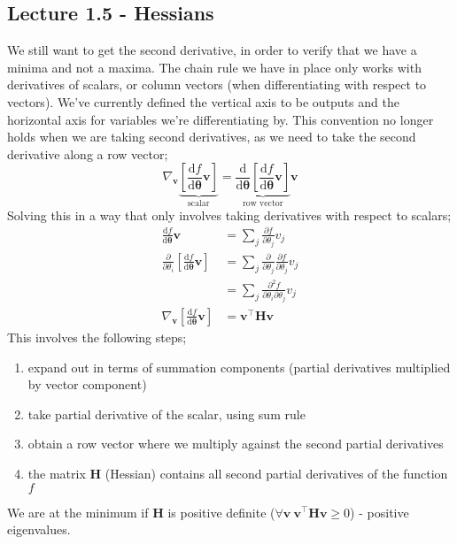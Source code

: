 \documentclass[a4paper, 12pt]{article}
\newcommand{\pdif}[2]{\frac{\partial #1}{\partial #2}}
\newcommand{\dif}[2]{\frac{\mathrm{d}#1}{\mathrm{d}#2}}
\newcommand{\summation}[2]{\sum\limits_{#1}^{#2}}
\newcommand{\mat}[1]{\boldsymbol{#1}}
\renewcommand{\vec}[1]{\boldsymbol{#1}}
\begin{document}
        \subsection*{Lecture 1.5 - Hessians}
            We still want to get the second derivative, in order to verify that we have a minima and not a maxima.
            The chain rule we have in place only works with derivatives of scalars, or column vectors (when differentiating with respect to vectors).
            We've currently defined the vertical axis to be outputs and the horizontal axis for variables we're differentiating by.
            This convention no longer holds when we are taking second derivatives, as we need to take the second derivative along a row vector;
            $$\nabla_{\vec{v}}\underbrace{\left[\dif{f}{\vec{\theta}}\vec{v}\right]}_\text{scalar} = \underbrace{\dif{}{\vec{\theta}}\left[\dif{f}{\vec{\theta}}\vec{v}\right]}_\text{row vector}\vec{v}$$
            Solving this in a way that only involves taking derivatives with respect to scalars;
            \setcounter{equation}{0}
            \begin{align}
                \dif{f}{\vec{\theta}}\vec{v} & = \summation{j}{} \pdif{f}{\theta_j}v_j \\
                \pdif{}{\theta_i}\left[\dif{f}{\vec{\theta}}\vec{v}\right] & = \summation{j}{} \pdif{}{\theta_j}\pdif{f}{\theta_j}v_j \\
                & = \summation{j}{} \pdif{^2f}{\theta_i\partial \theta_j} v_j \\
                \nabla_{\vec{v}}\left[\dif{f}{\vec{\theta}}\vec{v}\right] & = \vec{v}^\top\mat{H}\vec{v}
            \end{align}
            This involves the following steps;
            \begin{enumerate}[1.]
                \itemsep0em
                \item expand out in terms of summation components (partial derivatives multiplied by vector component)
                \item take partial derivative of the scalar, using sum rule
                \item obtain a row vector where we multiply against the second partial derivatives
                \item the matrix $\mat{H}$ (Hessian) contains all second partial derivatives of the function $f$
            \end{enumerate}
            We are at the minimum if $\mat{H}$ is positive definite ($\forall \vec{v}\ \vec{v}^\top\mat{H}\vec{v} \geq 0$) - positive eigenvalues.
\end{document}
